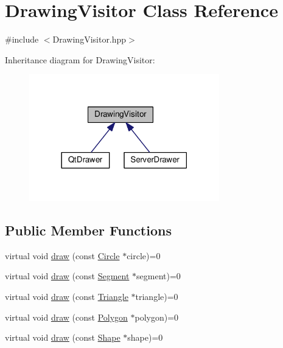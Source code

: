 \hypertarget{class_drawing_visitor}{}\section{Drawing\+Visitor Class Reference}
\label{class_drawing_visitor}


{\ttfamily \#include $<$Drawing\+Visitor.\+hpp$>$}



Inheritance diagram for Drawing\+Visitor\+:\nopagebreak
\begin{figure}[H]
\begin{center}
\leavevmode
\includegraphics[width=234pt]{class_drawing_visitor__inherit__graph}
\end{center}
\end{figure}
\subsection*{Public Member Functions}
\begin{DoxyCompactItemize}
\item 
virtual void \hyperlink{class_drawing_visitor_a287f6d770c755c1c3bc144fb08b65030}{draw} (const \hyperlink{class_circle}{Circle} $\ast$circle)=0
\item 
virtual void \hyperlink{class_drawing_visitor_a8a95018de31a7e3d7a067c347478ffde}{draw} (const \hyperlink{class_segment}{Segment} $\ast$segment)=0
\item 
virtual void \hyperlink{class_drawing_visitor_a178aa7e1bb9cfbd538d7de0dbfa2d4b1}{draw} (const \hyperlink{class_triangle}{Triangle} $\ast$triangle)=0
\item 
virtual void \hyperlink{class_drawing_visitor_a771a2110a3afe4e87688bddd65657a46}{draw} (const \hyperlink{class_polygon}{Polygon} $\ast$polygon)=0
\item 
virtual void \hyperlink{class_drawing_visitor_ad3d9e3028449f65ea2c405c74c4a55b4}{draw} (const \hyperlink{class_shape}{Shape} $\ast$shape)=0
\end{DoxyCompactItemize}


